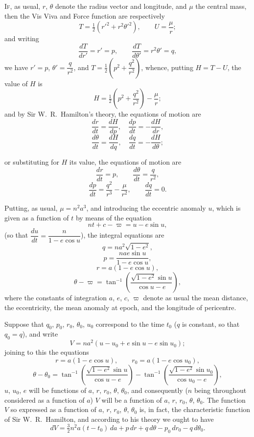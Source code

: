 \documentclass[11pt]{article}
\begin{document}
\textsc{If}, as usual, $r$, $\theta$ denote the radius vector and longitude, and $\mu$ the central mass, then the Vis Viva and Force function are respectively
\[
T=\tfrac{1}{2}(r'^{2}+r^{2}\theta'^{2}),\qquad U=\frac{\mu}{r};
\]
and writing
\[
\frac{dT}{dr'}=r'=p,\qquad \frac{dT}{d\theta'}=r^{2}\theta'=q,
\]
we have $r'=p$, $\theta'=\dfrac{q}{r^{2}}$, and $T=\tfrac{1}{2}\!\left(p^{2}+\dfrac{q^{2}}{r^{2}}\right)$, whence, putting $H=T-U$, the value of $H$ is
\[
H=\tfrac{1}{2}\!\left(p^{2}+\frac{q^{2}}{r^{2}}\right)-\frac{\mu}{r};
\]
and by Sir W.\ R.\ Hamilton's theory, the equations of motion are
\[
\frac{dr}{dt}=\frac{dH}{dp},\quad \frac{dp}{dt}=-\frac{dH}{dr},
\]
\[
\frac{d\theta}{dt}=\frac{dH}{dq},\quad \frac{dq}{dt}=-\frac{dH}{d\theta};
\]

\clearpage

or substituting for $H$ its value, the equations of motion are
\[
\frac{dr}{dt}=p,\qquad \frac{d\theta}{dt}=\frac{q}{r^{2}},
\]
\[
\frac{dp}{dt}=\frac{q^{2}}{r^{3}}-\frac{\mu}{r^{2}},\qquad \frac{dq}{dt}=0.
\]

Putting, as usual, $\mu=n^{2}a^{3}$, and introducing the eccentric anomaly $u$, which is given as a function of $t$ by means of the equation
\[
nt+c-\varpi=u-e\sin u,
\]
(so that $\dfrac{du}{dt}=\dfrac{n}{1-e\cos u}$), the integral equations are
\[
q = na^{2}\sqrt{1-e^{2}},
\]
\[
p = \frac{nae\sin u}{1-e\cos u},
\]
\[
r = a(1-e\cos u),
\]
\[
\theta - \varpi = \tan^{-1}\!\left(\frac{\sqrt{1-e^{2}}\sin u}{\cos u - e}\right),
\]
where the constants of integration $a$, $e$, $c$, $\varpi$ denote as usual the mean distance, the eccentricity, the mean anomaly at epoch, and the longitude of pericentre.

\medskip
Suppose that $q_{0}$, $p_{0}$, $r_{0}$, $\theta_{0}$, $u_{0}$ correspond to the time $t_{0}$ ($q$ is constant, so that $q_{0}=q$), and write
\[
V=na^{2}(u-u_{0}+e\sin u-e\sin u_{0});
\]
joining to this the equations
\[
r=a(1-e\cos u),\qquad r_{0}=a(1-e\cos u_{0}),
\]
\[
\theta-\theta_{0}=\tan^{-1}\!\left(\frac{\sqrt{1-e^{2}}\sin u}{\cos u - e}\right)-\tan^{-1}\!\left(\frac{\sqrt{1-e^{2}}\sin u_{0}}{\cos u_{0} - e}\right),
\]
$u$, $u_{0}$, $e$ will be functions of $a$, $r$, $r_{0}$, $\theta$, $\theta_{0}$, and consequently ($n$ being throughout considered as a function of $a$) $V$ will be a function of $a$, $r$, $r_{0}$, $\theta$, $\theta_{0}$. The function $V$ so expressed as a function of $a$, $r$, $r_{0}$, $\theta$, $\theta_{0}$ is, in fact, the characteristic function of Sir W.\ R.\ Hamilton, and according to his theory we ought to have
\[
dV = \tfrac{3}{2}n^{2}a(t-t_{0})\,da + p\,dr + q\,d\theta - p_{0}\,dr_{0} - q\,d\theta_{0}.
\]
\end{document}
